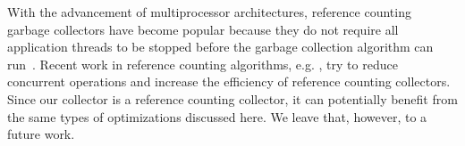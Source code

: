 
%

With the advancement of multiprocessor architectures,
reference counting garbage collectors have become popular because
they do not require all application threads to be stopped before the garbage collection algorithm can run~\cite{Levanoni2006}.
Recent work in reference counting algorithms, e.g. \cite{Barabash2005,Levanoni2006,Bacon2001,Bacon:2001:JWC}, try to
reduce concurrent operations and increase the efficiency of reference counting collectors.
Since our collector is a reference counting collector, it can potentially benefit from the
same types of optimizations discussed here. We leave that, however, to a future work.

%
%

